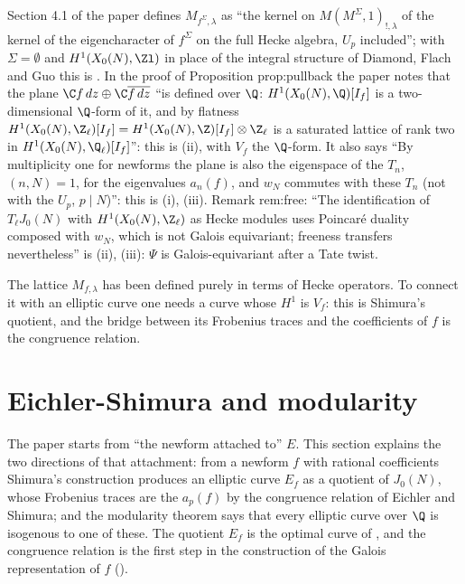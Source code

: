 \begin{paperlink}\label{pl:moddeg:f-lattice}
Section 4.1 of the paper defines $M_{f^\Sigma,\lambda}$ as ``the kernel on $M(M^\Sigma,1)_{!,\lambda}$ of the kernel of the eigencharacter of $f^\Sigma$ on the full Hecke algebra, $U_p$ included''; with
$\Sigma=\emptyset$ and $H^1(X_0(N),\Zl)$ in place of the integral structure of Diamond, Flach and Guo this is . In the proof of
Proposition prop:pullback the paper notes that the plane $\C f\,dz\oplus\C\overline{f\,dz}$ ``is defined over $\Q$: $H^1(X_0(N),\Q)[I_f]$ is a two-dimensional $\Q$-form of it, and by flatness
$H^1(X_0(N),\Z_\ell)[I_f]=H^1(X_0(N),\Z)[I_f]\otimes\Z_\ell$ is a saturated lattice of rank two in $H^1(X_0(N),\Q_\ell)[I_f]$'': this is (ii), with $V_f$ the $\Q$-form.
It also says ``By multiplicity one for newforms the plane is also the eigenspace of the $T_n$, $(n,N)=1$, for the eigenvalues $a_n(f)$, and $w_N$ commutes with these $T_n$ (not with the $U_p$,
$p\mid N$)'': this is (i), (iii). Remark rem:free: ``The identification of $T_\ell J_0(N)$ with $H^1(X_0(N),\Z_\ell)$ as
Hecke modules uses Poincar\'e duality composed with $w_N$, which is not Galois equivariant; freeness transfers nevertheless'' is (ii), (iii):
$\Psi$ is Galois-equivariant after a Tate twist.
\end{paperlink}

The lattice $M_{f,\lambda}$ has been defined purely in terms of Hecke operators. To connect it with an elliptic curve one needs a curve whose $H^1$ is $V_f$: this is
Shimura's quotient, and the bridge between its Frobenius traces and the coefficients of $f$ is the congruence relation.

\section{Eichler-Shimura and modularity}\label{sec:moddeg:eichler-shimura}

The paper starts from ``the newform attached to'' $E$. This section explains the two directions of that attachment: from a newform $f$ with rational coefficients
Shimura's construction produces an elliptic curve $E_f$ as a quotient of $J_0(N)$, whose Frobenius traces are the $a_p(f)$ by the congruence relation of Eichler and
Shimura; and the modularity theorem says that every elliptic curve over $\Q$ is isogenous to one of these. The quotient $E_f$ is the optimal curve of
, and the congruence relation is the first step in the construction of the Galois representation of $f$ ().

